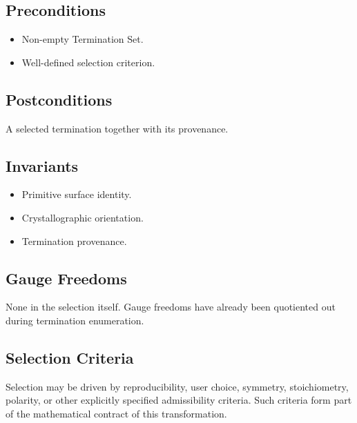 \subsection{Preconditions}

\begin{itemize}
\item Non-empty Termination Set.
\item Well-defined selection criterion.
\end{itemize}

\subsection{Postconditions}

A selected termination together with its provenance.

\subsection{Invariants}

\begin{itemize}
\item Primitive surface identity.
\item Crystallographic orientation.
\item Termination provenance.
\end{itemize}

\subsection{Gauge Freedoms}

None in the selection itself. Gauge freedoms have already been quotiented
out during termination enumeration.

\subsection{Selection Criteria}

Selection may be driven by reproducibility, user choice, symmetry,
stoichiometry, polarity, or other explicitly specified admissibility
criteria. Such criteria form part of the mathematical contract of this
transformation.
